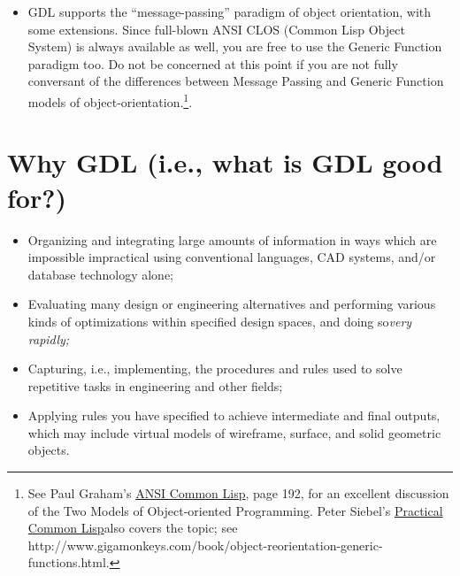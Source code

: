 \documentclass [11pt]{book}
\begin{document}
\begin{itemize}
\begin{itemize}
\end{itemize}


\item GDL supports the ``message-passing'' paradigm of object
orientation, with some extensions. Since full-blown ANSI CLOS (Common
Lisp Object System) is always available as well, you are free to use
the Generic Function paradigm too. Do not be concerned at this point
if you are not fully conversant of the differences between Message
Passing and Generic Function models of object-orientation.\footnote{See Paul Graham's 
\underline{ANSI Common Lisp}, page 192, for an excellent discussion of the Two Models 
of Object-oriented Programming. Peter Siebel's 
\underline{Practical Common Lisp}also covers the topic; see http://www.gigamonkeys.com/book/object-reorientation-generic-functions.html.}.

\end{itemize}



\section{Why GDL (i.e., what is GDL good for?)}

\label{sec:whygdl(i.e.,whatisgdlgoodfor?)}



\begin{itemize}

\item Organizing and integrating large amounts of
information in ways which are impossible impractical using
conventional languages, CAD systems, and/or database technology
alone;

\item Evaluating many design or engineering alternatives and 
performing various kinds of optimizations within specified design
spaces, and doing so\emph{very rapidly;}

\item Capturing, i.e., implementing, the procedures and rules used
to solve repetitive tasks in engineering and other fields;

\item Applying rules you have specified to achieve intermediate
and final outputs, which may include virtual models of wireframe,
surface, and solid geometric objects.

\end{itemize}
\end{document}
